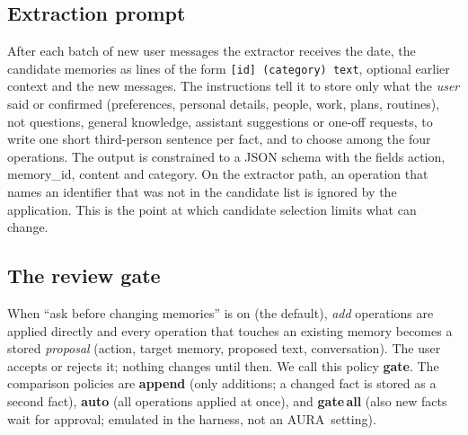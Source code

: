 \IfFileExists{IEEEtran.cls}{\documentclass[journal]{IEEEtran}\def\HAVEIEEE{1}}{\documentclass[10pt,twocolumn]{article}\usepackage[margin=0.7in,columnsep=0.25in]{geometry}}
\newcommand{\aura}{AURA}
\begin{document}
\begin{table}[t]
\centering\footnotesize
\caption{Memory and proposal records.}
\label{tab:model}
\end{table}

\subsection{Extraction prompt}
After each batch of new user messages the extractor receives the date, the candidate memories as lines of the form \texttt{[id] (category) text}, optional earlier context and the new messages. The instructions tell it to store only what the \emph{user} said or confirmed (preferences, personal details, people, work, plans, routines), not questions, general knowledge, assistant suggestions or one-off requests, to write one short third-person sentence per fact, and to choose among the four operations. The output is constrained to a JSON schema with the fields action, memory\_id, content and category. On the extractor path, an operation that names an identifier that was not in the candidate list is ignored by the application. This is the point at which candidate selection limits what can change.

\subsection{The review gate}
When ``ask before changing memories'' is on (the default), \emph{add} operations are applied directly and every operation that touches an existing memory becomes a stored \emph{proposal} (action, target memory, proposed text, conversation). The user accepts or rejects it; nothing changes until then. We call this policy \textbf{gate}. The comparison policies are \textbf{append} (only additions; a changed fact is stored as a second fact), \textbf{auto} (all operations applied at once), and \textbf{gate\,all} (also new facts wait for approval; emulated in the harness, not an \aura\ setting).
\end{document}
